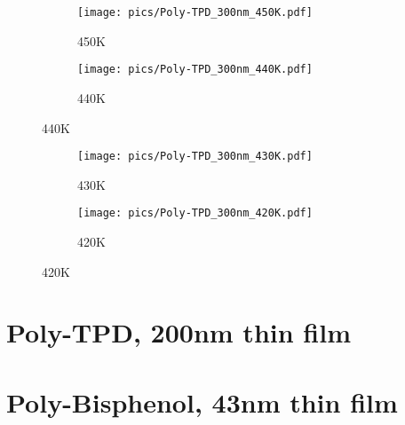 \begin{figure}[!htb]
\centering
\begin{subfigure}[t]{.5\textwidth}
  \centering
  \texttt{[image: pics/Poly-TPD\_300nm\_450K.pdf]}
  \caption{450K}
  \label{fig:sub1}
\end{subfigure}%
\begin{subfigure}[t]{.5\textwidth}
  \centering
  \texttt{[image: pics/Poly-TPD\_300nm\_440K.pdf]}
  \caption{440K}
  \label{fig:sub2}
\end{subfigure}
  \label{14bis}
\end{figure}
\begin{figure}[!htb]
\centering
\begin{subfigure}[t]{.5\textwidth}
  \centering
  \texttt{[image: pics/Poly-TPD\_300nm\_430K.pdf]}
  \caption{430K}
  \label{fig:sub1}
\end{subfigure}%
\begin{subfigure}[t]{.5\textwidth}
  \centering
  \texttt{[image: pics/Poly-TPD\_300nm\_420K.pdf]}
  \caption{420K}
  \label{fig:sub2}
\end{subfigure}
  \label{14bis}
\end{figure}



\section{Poly-TPD, 200nm thin film}

\section{Poly-Bisphenol, 43nm thin film}
